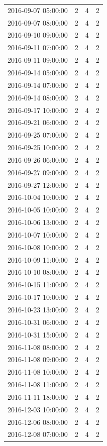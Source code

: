 \begin{tabular}{lrrr}
2016-09-07 05:00:00 & 2 & 4 & 2 \\
2016-09-07 08:00:00 & 2 & 4 & 2 \\
2016-09-10 09:00:00 & 2 & 4 & 2 \\
2016-09-11 07:00:00 & 2 & 4 & 2 \\
2016-09-11 09:00:00 & 2 & 4 & 2 \\
2016-09-14 05:00:00 & 2 & 4 & 2 \\
2016-09-14 07:00:00 & 2 & 4 & 2 \\
2016-09-14 08:00:00 & 2 & 4 & 2 \\
2016-09-17 10:00:00 & 2 & 4 & 2 \\
2016-09-21 06:00:00 & 2 & 4 & 2 \\
2016-09-25 07:00:00 & 2 & 4 & 2 \\
2016-09-25 10:00:00 & 2 & 4 & 2 \\
2016-09-26 06:00:00 & 2 & 4 & 2 \\
2016-09-27 09:00:00 & 2 & 4 & 2 \\
2016-09-27 12:00:00 & 2 & 4 & 2 \\
2016-10-04 10:00:00 & 2 & 4 & 2 \\
2016-10-05 10:00:00 & 2 & 4 & 2 \\
2016-10-06 13:00:00 & 2 & 4 & 2 \\
2016-10-07 10:00:00 & 2 & 4 & 2 \\
2016-10-08 10:00:00 & 2 & 4 & 2 \\
2016-10-09 11:00:00 & 2 & 4 & 2 \\
2016-10-10 08:00:00 & 2 & 4 & 2 \\
2016-10-15 11:00:00 & 2 & 4 & 2 \\
2016-10-17 10:00:00 & 2 & 4 & 2 \\
2016-10-23 13:00:00 & 2 & 4 & 2 \\
2016-10-31 06:00:00 & 2 & 4 & 2 \\
2016-10-31 15:00:00 & 2 & 4 & 2 \\
2016-11-08 08:00:00 & 2 & 4 & 2 \\
2016-11-08 09:00:00 & 2 & 4 & 2 \\
2016-11-08 10:00:00 & 2 & 4 & 2 \\
2016-11-08 11:00:00 & 2 & 4 & 2 \\
2016-11-11 18:00:00 & 2 & 4 & 2 \\
2016-12-03 10:00:00 & 2 & 4 & 2 \\
2016-12-06 08:00:00 & 2 & 4 & 2 \\
2016-12-08 07:00:00 & 2 & 4 & 2 \\

\end{tabular}
